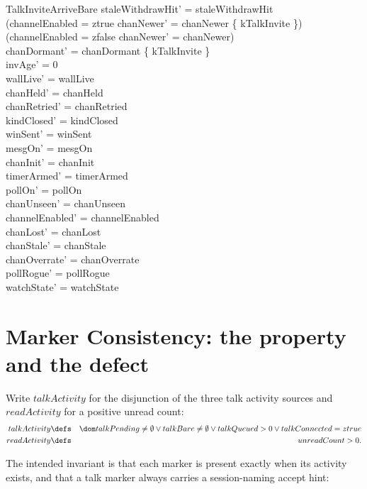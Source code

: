 \documentclass[a4paper,10pt,fleqn]{article}
\begin{document}
\begin{schema}{TalkInviteArriveBare}
  staleWithdrawHit' = staleWithdrawHit \\
  (channelEnabled = ztrue \implies
  chanNewer' = chanNewer \cup \{ kTalkInvite \}) \\
  (channelEnabled = zfalse \implies chanNewer' = chanNewer) \\
  chanDormant' = chanDormant \setminus \{ kTalkInvite \} \\
  invAge' = 0 \\
  wallLive' = wallLive \\
  chanHeld' = chanHeld \\
  chanRetried' = chanRetried \\
  kindClosed' = kindClosed \\
  winSent' = winSent \\
  mesgOn' = mesgOn \\
  chanInit' = chanInit \\
  timerArmed' = timerArmed \\
  pollOn' = pollOn \\
  chanUnseen' = chanUnseen \\
  channelEnabled' = channelEnabled \\
  chanLost' = chanLost \\
  chanStale' = chanStale \\
  chanOverrate' = chanOverrate \\
  pollRogue' = pollRogue \\
  watchState' = watchState
\end{schema}

\section{Marker Consistency: the property and the defect}
\label{sec:markerprops}

Write $talkActivity$ for the disjunction of the three talk activity
sources and $readActivity$ for a positive unread count:
\begin{eqnarray*}
  talkActivity & \defs & \dom talkPending \neq \emptyset \lor
    talkBare \neq \emptyset \lor talkQueued > 0 \lor
    talkConnected = ztrue \\
  readActivity & \defs & unreadCount > 0.
\end{eqnarray*}

The intended invariant is that each marker is present exactly when its
activity exists, and that a talk marker always carries a session-naming
accept hint:
\end{document}

